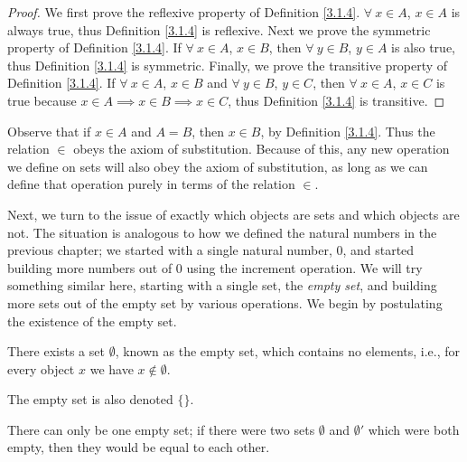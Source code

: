 \begin{proof}
We first prove the reflexive property of Definition \ref{3.1.4}.
\(\forall\ x \in A\), \(x \in A\) is always true, thus Definition \ref{3.1.4} is reflexive.
Next we prove the symmetric property of Definition \ref{3.1.4}.
If \(\forall\ x \in A\), \(x \in B\), then \(\forall\ y \in B\), \(y \in A\) is also true, thus Definition \ref{3.1.4} is symmetric.
Finally, we prove the transitive property of Definition \ref{3.1.4}.
If \(\forall\ x \in A\), \(x \in B\) and \(\forall\ y \in B\), \(y \in C\), then \(\forall\ x \in A\), \(x \in C\) is true because \(x \in A \implies x \in B \implies x \in C\), thus Definition \ref{3.1.4} is transitive.
\end{proof}

\begin{note}
Observe that if \(x \in A\) and \(A = B\), then \(x \in B\), by Definition \ref{3.1.4}.
Thus the  relation \(\in\) obeys the axiom of substitution.
Because of this, any new operation we define on sets will also obey the axiom of substitution, as long as we can define that operation purely in terms of the relation \(\in\).
\end{note}

Next, we turn to the issue of exactly which objects are sets and which objects are not.
The situation is analogous to how we defined the natural numbers in the previous chapter;
we started with a single natural number, \(0\), and started building more numbers out of \(0\) using the increment operation.
We will try something similar here, starting with a single set, the \emph{empty set},
and building more sets out of the empty set by various operations.
We begin by postulating the existence of the empty set.

\begin{axiom}\label{3.2}
There exists a set \(\emptyset\), known as the empty set, which contains no elements, i.e., for every object \(x\) we have \(x \notin \emptyset\).
\end{axiom}

\begin{note}
The empty set is also denoted \(\{\}\).
\end{note}

\begin{additional corollary}\label{ac 3.1.2}
There can only be one empty set;
if there were two sets \(\emptyset\) and \(\emptyset'\) which were both empty, then they would be equal to each other.
\end{additional corollary}

